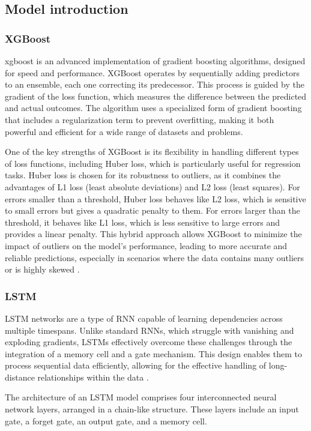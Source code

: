 \documentclass{article} %
\begin{document}
\subsection{Model introduction}
\subsubsection{XGBoost}     
\gls{xgboost} is an advanced implementation of gradient boosting algorithms, designed for speed and performance. 
XGBoost operates by sequentially adding predictors to an ensemble, each one correcting its predecessor. This process is guided by the gradient of the loss function, which measures the difference between the predicted and actual outcomes. The algorithm uses a specialized form of gradient boosting that includes a regularization term to prevent overfitting, making it both powerful and efficient for a wide range of datasets and problems\cite{chen2015xgboost}.

One of the key strengths of XGBoost is its flexibility in handling different types of loss functions, including Huber loss, which is particularly useful for regression tasks. Huber loss is chosen for its robustness to outliers, as it combines the advantages of L1 loss (least absolute deviations) and L2 loss (least squares). For errors smaller than a threshold, Huber loss behaves like L2 loss, which is sensitive to small errors but gives a quadratic penalty to them. For errors larger than the threshold, it behaves like L1 loss, which is less sensitive to large errors and provides a linear penalty. This hybrid approach allows XGBoost to minimize the impact of outliers on the model's performance, leading to more accurate and reliable predictions, especially in scenarios where the data contains many outliers or is highly skewed \cite{kulisz2024optimizing}.

\subsubsection{LSTM}
\Gls{LSTM} networks are a type of \gls{RNN} capable of learning dependencies across multiple timespans. Unlike standard \glspl{RNN}, which struggle with vanishing and exploding gradients, LSTMs effectively overcome these challenges through the integration of a memory cell and a gate mechanism. This design enables them to process sequential data efficiently, allowing for the effective handling of long-distance relationships within the data \cite{hochreiter1997long}.

The architecture of an \Gls{LSTM} model comprises four interconnected neural network layers, arranged in a chain-like structure. These layers include an input gate, a forget gate, an output gate, and a memory cell.
\end{document}
